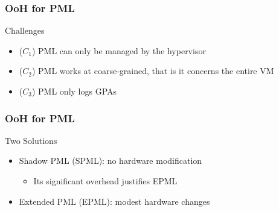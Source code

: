 \documentclass[xcolor=table,bigger,unknownkeysallowed]{beamer}
\begin{document}
\begin{frame}
	\frametitle{OoH for PML}	

	\begin{block}{Challenges}
		\begin{itemize}
			\item ($C_1$) PML can only be managed by the hypervisor
			\item ($C_2$) PML works at coarse-grained, that is it concerns the entire VM
			\item ($C_3$) PML only logs GPAs
		\end{itemize}
	\end{block} 

\end{frame}         
\begin{frame}
	\frametitle{OoH for PML}			
	\begin{block}{Two Solutions}
		\begin{itemize}
			\item Shadow PML (SPML): no hardware modification					
			\begin{itemize}
				\item[\ding{50}] Its significant overhead justifies EPML
			\end{itemize}
			\item Extended PML (EPML): modest hardware changes
		\end{itemize}
	\end{block} 
\end{frame}  
\end{document}
